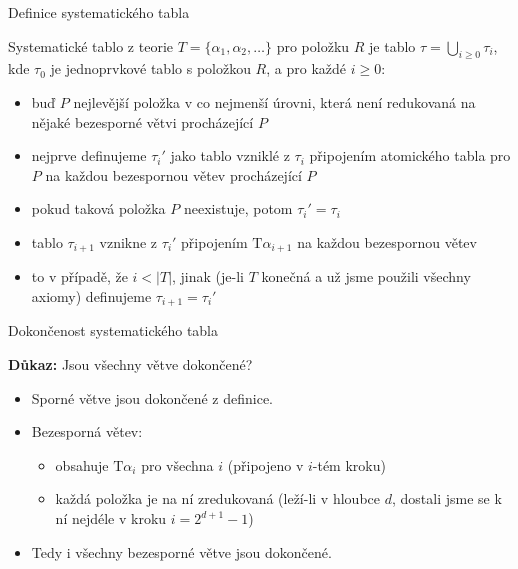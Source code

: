 \documentclass{beamer}
\begin{document}
\begin{frame}{Definice systematického tabla}
 
    \alert{Systematické tablo} z teorie $T=\{\alpha_1,\alpha_2,\dots\}$ pro položku $R$ je tablo $\tau=\bigcup_{i\geq 0}\tau_i$, kde $\tau_0$ je jednoprvkové tablo s položkou $R$, a pro každé $i\geq 0$:\pause

    \begin{itemize}[<+->]
        \item buď $P$ nejlevější položka v co nejmenší úrovni, která není redukovaná na nějaké bezesporné větvi procházející $P$
        \item nejprve definujeme $\tau_i'$ jako tablo vzniklé z $\tau_i$ připojením atomického tabla pro $P$ na každou bezespornou větev procházející $P$
        \item pokud taková položka $P$ neexistuje, potom $\tau_i'=\tau_i$
        \item tablo $\tau_{i+1}$ vznikne z $\tau_i'$ připojením $\mathrm{T}\alpha_{i+1}$ na každou bezespornou větev
        \item to v případě, že $i<|T|$, jinak (je-li $T$ konečná a už jsme použili všechny axiomy) definujeme $\tau_{i+1}=\tau_i'$
    \end{itemize}  

\end{frame}


\begin{frame}{Dokončenost systematického tabla}


    \pause
    \textbf{Důkaz:} 
    Jsou všechny větve dokončené?\pause

    \begin{itemize}
        \item Sporné větve jsou dokončené z definice.\pause
        \item Bezesporná větev:\pause
        \begin{itemize}
            \item \alert{obsahuje $\mathrm{T}\alpha_i$} pro všechna $i$ (připojeno v $i$-tém kroku)\pause
            \item každá položka je na ní \alert{zredukovaná} (leží-li v hloubce $d$, dostali jsme se k ní nejdéle v kroku $i=2^{d+1}-1$)\pause
        \end{itemize}  
        \item Tedy i všechny bezesporné větve jsou dokončené.\hfill\qedsymbol        
    \end{itemize}  

\end{frame}
\end{document}
